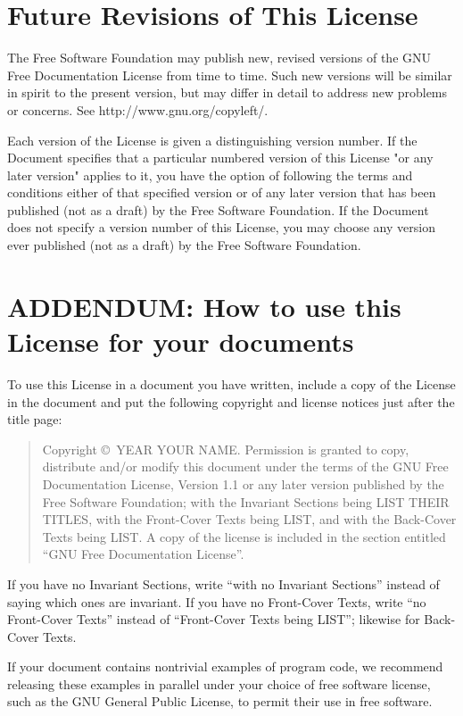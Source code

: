 \documentclass[a4paper,11pt,twoside,dvips]{report}
\begin{document}
\section{Future Revisions of This License}

The Free Software Foundation may publish new, revised versions
of the GNU Free Documentation License from time to time.  Such new
versions will be similar in spirit to the present version, but may
differ in detail to address new problems or concerns. See
http://www.gnu.org/copyleft/.

Each version of the License is given a distinguishing version number.
If the Document specifies that a particular numbered version of this
License "or any later version" applies to it, you have the option of
following the terms and conditions either of that specified version or
of any later version that has been published (not as a draft) by the
Free Software Foundation.  If the Document does not specify a version
number of this License, you may choose any version ever published (not
as a draft) by the Free Software Foundation.

\section*{ADDENDUM: How to use this License for your documents}

To use this License in a document you have written, include a copy of
the License in the document and put the following copyright and
license notices just after the title page:

\begin{quote}

      Copyright \copyright\ YEAR  YOUR NAME.
      Permission is granted to copy, distribute and/or modify this document
      under the terms of the GNU Free Documentation License, Version 1.1
      or any later version published by the Free Software Foundation;
      with the Invariant Sections being LIST THEIR TITLES, with the
      Front-Cover Texts being LIST, and with the Back-Cover Texts being LIST.
      A copy of the license is included in the section entitled ``GNU
      Free Documentation License''.

\end{quote}

If you have no Invariant Sections, write ``with no Invariant Sections''
instead of saying which ones are invariant.  If you have no
Front-Cover Texts, write ``no Front-Cover Texts'' instead of
``Front-Cover Texts being LIST''; likewise for Back-Cover Texts.

If your document contains nontrivial examples of program code, we
recommend releasing these examples in parallel under your choice of
free software license, such as the GNU General Public License,
to permit their use in free software.
\end{document}
